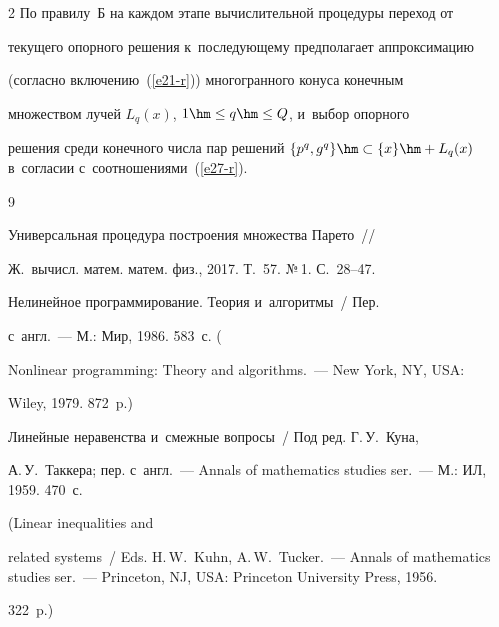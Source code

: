 \begin{multicols}{2}
  По правилу~Б на каждом этапе вычислительной процедуры переход от 


текущего опорного решения к~последующему предполагает аппроксимацию 


(согласно включению~(\ref{e21-r})) многогранного конуса конечным 


множеством лучей $L_q(x)$, $1\hm\leq q\hm\leq Q$, и~выбор опорного 


решения среди конечного чис\-ла пар решений $\{ p^q, g^q\}\hm\subset \{x\} 


\hm+ L_q(x)$ в~согласии с~соотношениями~(\ref{e27-r}).





\vspace*{-6pt}





{\small\frenchspacing


 {\baselineskip=10.6pt




 \begin{thebibliography}{9}




 Универсальная процедура построения множества Парето~// 


Ж.~вычисл. матем. матем. физ., 2017. Т.~57. №\,1. С.~28--47.




 Нелинейное программирование. Теория и~алгоритмы~/ Пер. 


с~англ.~--- М.: Мир, 1986. 583~с. (  


Nonlinear programming: Theory and algorithms.~--- New York, NY, USA: 


Wiley, 1979. 872~p.)




Линейные неравенства и~смежные вопросы~/ Под ред. Г.\,У.~Куна, 


А.\,У.~Таккера; пер. с~англ.~--- Annals of mathematics studies ser.~--- М.: ИЛ, 1959. 470~с.


(Linear inequalities and 


related systems~/ Eds. H.\,W.~Kuhn, A.\,W.~Tucker.~--- Annals of mathematics studies ser.~---  Princeton, NJ, USA: Princeton University Press, 1956. 


322~p.)





\end{thebibliography}}}
\end{multicols}
